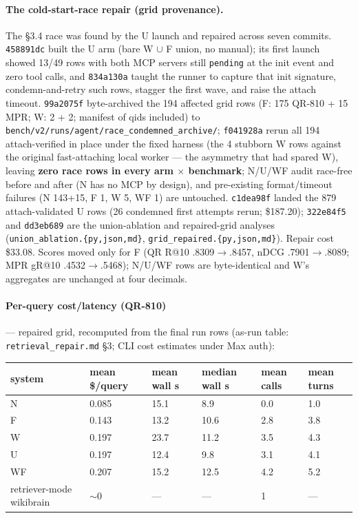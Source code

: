 \documentclass[10pt]{article}
\newcommand{\code}[1]{\texttt{#1}}
\begin{document}
\paragraph{The cold-start-race repair (grid provenance).} The \S 3.4
race was found by the U launch and repaired across seven commits.
\code{458891dc} built the U arm (bare W $\cup$ F union, no manual);
its first launch showed 13/49 rows with both MCP servers still
\code{pending} at the init event and zero tool calls, and
\code{834a130a} taught the runner to capture that init signature,
condemn-and-retry such rows, stagger the first wave, and raise the
attach timeout. \code{99a2075f} byte-archived the 194 affected grid
rows (F: 175 QR-810 + 15 MPR; W: 2 + 2; manifest of qids included) to
\code{bench/v2/runs/agent/race\_condemned\_archive/};
\code{f041928a} rerun all 194 attach-verified in place under the fixed
harness (the 4 stubborn W rows against the original fast-attaching
local worker --- the asymmetry that had spared W), leaving \textbf{zero
race rows in every arm $\times$ benchmark}; N/U/WF audit race-free
before and after (N has no MCP by design), and pre-existing
format/timeout failures (N 143+15, F 1, W 5, WF 1) are untouched.
\code{c1dea98f} landed the 879 attach-validated U rows (26 condemned
first attempts rerun; \$187.20); \code{322e84f5} and \code{dd3eb689}
are the union-ablation and repaired-grid analyses
(\code{union\_ablation.\{py,json,md\}},
\code{grid\_repaired.\{py,json,md\}}). Repair cost \$33.08. Scores
moved only for F (QR R@10 .8309$\to$.8457, nDCG .7901$\to$.8089; MPR
gR@10 .4532$\to$.5468); N/U/WF rows are byte-identical and W's
aggregates are unchanged at four decimals.

\paragraph{Per-query cost/latency (QR-810)} --- repaired grid,
recomputed from the final run rows (as-run table:
\code{retrieval\_repair.md} \S 3; CLI cost estimates under Max auth):

\begin{center}\footnotesize
\begin{tabular}{@{}llllll@{}}
\toprule
system & mean \$/query & mean wall s & median wall s & mean calls & mean turns \\
\midrule
N & 0.085 & 15.1 & 8.9 & 0.0 & 1.0 \\
F & 0.143 & 13.2 & 10.6 & 2.8 & 3.8 \\
W & 0.197 & 23.7 & 11.2 & 3.5 & 4.3 \\
U & 0.197 & 12.4 & 9.8 & 3.1 & 4.1 \\
WF & 0.207 & 15.2 & 12.5 & 4.2 & 5.2 \\
retriever-mode wikibrain & $\sim$0 & --- & --- & 1 & --- \\
\bottomrule
\end{tabular}
\end{center}
\end{document}

